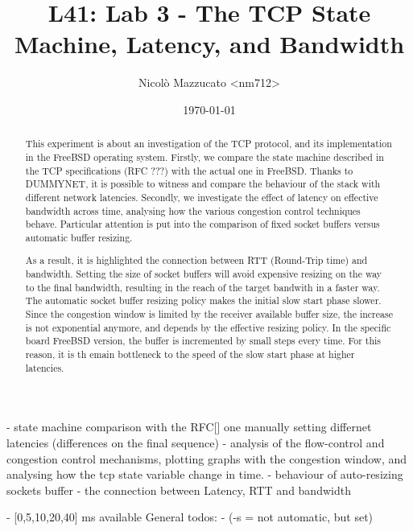 \documentclass[a4paper,10pt]{article}
\begin{document}
\title{L41: Lab 3 - The TCP State Machine, Latency, and Bandwidth}
\author{Nicolò Mazzucato \textless{}nm712\textgreater{}}
\date{\today}

\maketitle

\thispagestyle{empty}

\begin{abstract}           
   This experiment is about an investigation of the TCP protocol, and its
   implementation in the FreeBSD operating system. Firstly, we compare the state machine described
   in the TCP specifications (RFC ???) with the actual one in FreeBSD. Thanks
   to DUMMYNET, it is possible to witness and compare the behaviour of the
   stack with different network latencies. Secondly, we investigate the effect
   of latency on effective bandwidth across time, analysing how the various
   congestion control techniques behave. Particular attention is put into the
   comparison of fixed socket buffers versus automatic buffer resizing.

   As a result, it is highlighted the connection between RTT (Round-Trip time) and bandwidth. 
   Setting the size of socket buffers will avoid expensive resizing on the way to the final bandwidth, resulting in the reach of the target bandwith in a faster way. The automatic socket buffer resizing policy makes the initial slow start phase slower. Since the congestion window is limited by the receiver available buffer size, the increase is not exponential anymore, and depends by the effective resizing policy. In the specific board FreeBSD version, the buffer is incremented by small steps every time. For this reason, it is th emain bottleneck to the speed of the slow start phase at higher latencies.
 
\end{abstract}

\iffalse
- state machine comparison with the RFC[] one manually setting differnet latencies (differences on the final sequence)
   - analysis of the flow-control and congestion control mechanisms, plotting graphs with the congestion window, and analysing how the tcp state variable change in time.
   - behaviour of auto-resizing sockets buffer
   - the connection between Latency, RTT and bandwidth

- [0,5,10,20,40] ms available
General todos:
- (-s = not automatic, but set)
\end{document}
